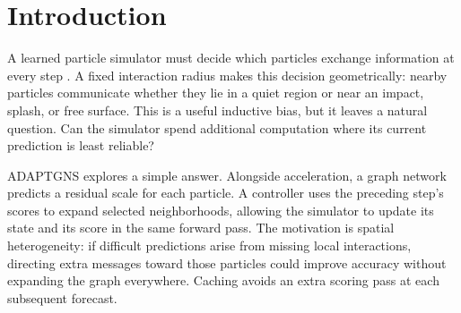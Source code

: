 
\begin{abstract}
Particle graph-network simulators reconstruct local interaction graphs from a fixed geometric rule, even when prediction difficulty varies across a scene. We study a lightweight controller that uses the preceding step's predicted residual scale to allocate extra local edges. A reproducibility audit shows why three quantities must be distinguished: predicted residual risk, the benefit of additional interactions, and the geometry-dependent cost of a free rollout. In particular, an expansion policy cannot reduce edges on identical positions, and accurate residual prediction does not guarantee useful allocation. We formulate an exact incremental pair budget, apply established faithful heteroscedastic regression to preserve the mean predictor's squared-error gradients, and derive a conditional allocation-regret bound separating estimation error, temporal lag, and risk--benefit mismatch. Reanalysis of released rollouts does not resolve the previously reported WaterDrop accuracy advantage at step 200 and reverses its sign over the full saved horizon. New controlled CPU experiments evaluate alternative objectives and matched-budget policies on a small public WaterDrop subset. The resulting evidence supports a reproducible study of adaptive computation, while leaving full-scale accuracy--runtime superiority unestablished.
\end{abstract}

\section{Introduction}
A learned particle simulator must decide which particles exchange information at every step \citep{sanchez2020}. A fixed interaction radius makes this decision geometrically: nearby particles communicate whether they lie in a quiet region or near an impact, splash, or free surface. This is a useful inductive bias, but it leaves a natural question. Can the simulator spend additional computation where its current prediction is least reliable?

ADAPTGNS explores a simple answer. Alongside acceleration, a graph network predicts a residual scale for each particle. A controller uses the preceding step's scores to expand selected neighborhoods, allowing the simulator to update its state and its score in the same forward pass. The motivation is spatial heterogeneity: if difficult predictions arise from missing local interactions, directing extra messages toward those particles could improve accuracy without expanding the graph everywhere. Caching avoids an extra scoring pass at each subsequent forecast.

